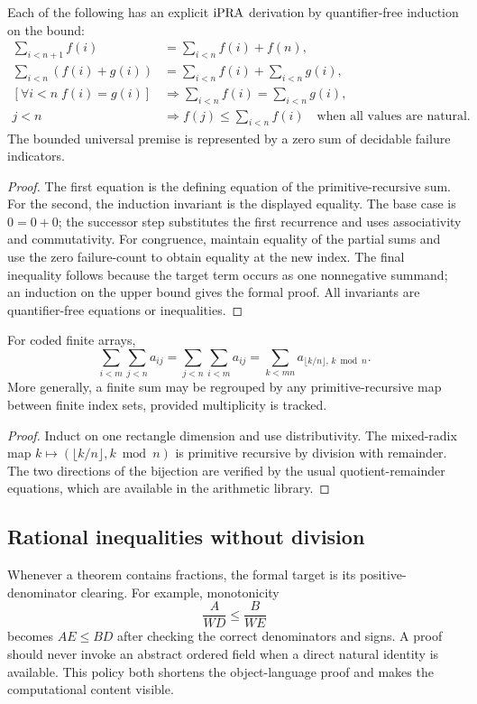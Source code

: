 \begin{proposition}\label{prop:sum-compile}
Each of the following has an explicit \(\mathrm{iPRA}\) derivation by
quantifier-free induction on the bound:
\begin{align*}
 \sum_{i<n+1}f(i)&=\sum_{i<n}f(i)+f(n),\\
 \sum_{i<n}(f(i)+g(i))&=\sum_{i<n}f(i)+\sum_{i<n}g(i),\\
 \left[\forall i<n\;f(i)=g(i)\right]&\Longrightarrow
     \sum_{i<n}f(i)=\sum_{i<n}g(i),\\
 j<n&\Longrightarrow f(j)\le\sum_{i<n}f(i)
 \quad\text{when all values are natural.}
\end{align*}
The bounded universal premise is represented by a zero sum of decidable
failure indicators.
\end{proposition}

\begin{proof}
The first equation is the defining equation of the primitive-recursive sum.
For the second, the induction invariant is the displayed equality.  The base
case is \(0=0+0\); the successor step substitutes the first recurrence and
uses associativity and commutativity.  For congruence, maintain equality of the
partial sums and use the zero failure-count to obtain equality at the new
index.  The final inequality follows because the target term occurs as one
nonnegative summand; an induction on the upper bound gives the formal proof.
All invariants are quantifier-free equations or inequalities.
\end{proof}

\begin{corollary}\label{cor:finite-fubini}
For coded finite arrays,
\[
 \sum_{i<m}\sum_{j<n}a_{ij}
 =\sum_{j<n}\sum_{i<m}a_{ij}
 =\sum_{k<mn}a_{\lfloor k/n\rfloor,\,k\bmod n}.
\]
More generally, a finite sum may be regrouped by any primitive-recursive map
between finite index sets, provided multiplicity is tracked.
\end{corollary}

\begin{proof}
Induct on one rectangle dimension and use distributivity.  The mixed-radix
map \(k\mapsto(\lfloor k/n\rfloor,k\bmod n)\) is primitive recursive by division
with remainder.  The two directions of the bijection are verified by the
usual quotient-remainder equations, which are available in the arithmetic
library.
\end{proof}

\subsection{Rational inequalities without division}

Whenever a theorem contains fractions, the formal target is its
positive-denominator clearing.  For example, monotonicity
\[
 \frac{A}{WD}\le\frac{B}{WE}
\]
becomes \(AE\le BD\) after checking the correct denominators and signs.  A
proof should never invoke an abstract ordered field when a direct natural
identity is available.  This policy both shortens the object-language proof
and makes the computational content visible.
